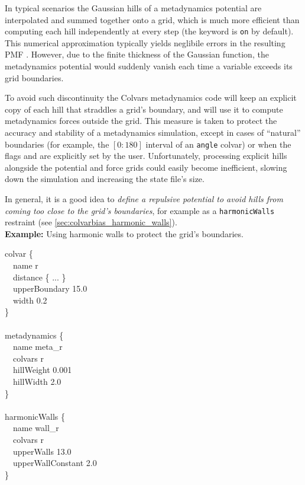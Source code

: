 
In typical scenarios the Gaussian hills of a metadynamics potential are interpolated and summed together onto a grid, which is much more efficient than computing each hill independently at every step (the keyword  is \texttt{on} by default).
This numerical approximation typically yields neglibile errors in the resulting PMF \cite{Fiorin2013}.
However, due to the finite thickness of the Gaussian function, the metadynamics potential would suddenly vanish each time a variable exceeds its grid boundaries.

To avoid such discontinuity the Colvars metadynamics code will keep an explicit copy of each hill that straddles a grid's boundary, and will use it to compute metadynamics forces outside the grid.
This measure is taken to protect the accuracy and stability of a metadynamics simulation, except in cases of ``natural'' boundaries (for example, the $[0:180]$ interval of an \texttt{angle} colvar) or when the flags  and  are explicitly set by the user.
Unfortunately, processing explicit hills alongside the potential and force grids could easily become inefficient, slowing down the simulation and increasing the state file's size.

In general, it is a good idea to \emph{define a repulsive potential to avoid hills from coming too close to the grid's boundaries}, for example as a \texttt{harmonicWalls} restraint (see \ref{sec:colvarbias_harmonic_walls}).\\

\noindent\textbf{Example:} Using harmonic walls to protect the grid's boundaries.
\begin{cvexampleinput}
\-colvar \{\\
\-\-~~name r\\
\-\-~~distance \{ ... \}\\
\-\-~~upperBoundary 15.0\\
\-\-~~width 0.2\\
\-\}\\
\\
\-metadynamics \{\\
\-\-~~name meta\_r\\
\-\-~~colvars r\\
\-\-~~hillWeight 0.001\\
\-\-~~hillWidth 2.0\\
\-\}\\
\\
\-harmonicWalls \{\\
\-\-~~name wall\_r\\
\-\-~~colvars r\\
\-\-~~upperWalls 13.0\\
\-\-~~upperWallConstant 2.0\\
\-\}
\end{cvexampleinput}

